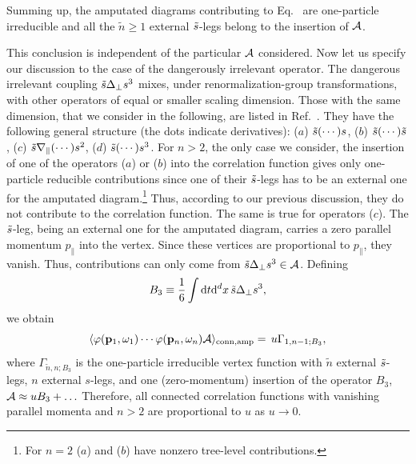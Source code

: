 \documentclass[12pt]{article}
\begin{document}
Summing up, the amputated diagrams contributing to
Eq.~ are one-particle irreducible and all the $\tilde{n}\ge
1$ external $\tilde{s}$-legs belong to the insertion of ${\cal A}$.

This conclusion is independent of the particular ${\cal A}$
considered. Now let us specify our discussion to the case of the
dangerously irrelevant operator. The dangerous irrelevant coupling 
$\tilde{s}\Delta_{\bot} s^3$ mixes, under renormalization-group transformations, 
with other operators of equal or
smaller scaling dimension. Those with the same dimension, that we
consider in the following, are listed in 
Ref.~\cite{Janssen86a}. 
They have the following general structure (the dots 
indicate derivatives): ($a$) $\tilde{s} (\cdots) s$, ($b$)
$\tilde{s} (\cdots) \tilde{s}$, ($c$) $\tilde{s} \nabla_{\|} (\cdots) s^2$,
($d$) $\tilde{s} (\cdots) s^3$.
For $n > 2$, the only case we consider,
the insertion of one of the operators ($a$) or ($b$) into
the correlation function gives only
one-particle reducible contributions since one of their $\tilde{s}$-legs
has to be an external one for the amputated diagram.\footnote{For $n=2$
($a$) and ($b$) have nonzero tree-level contributions.} Thus, according
to our previous discussion, they do not 
contribute to the correlation function. The same is true for operators 
($c$). The $\tilde{s}$-leg, 
being an external one for the amputated diagram,
carries a zero parallel momentum $p_\|$ into the vertex. Since
these vertices are proportional
to  $p_\|$, they vanish.
Thus, contributions can only come from $\tilde{s} \Delta_{\bot} s^3\in {\cal A}$. 
Defining
\begin{equation}
B_3 \equiv \frac{1}{6}\int {\rm d} t {\rm d}^dx \, \tilde{s} \Delta_{\bot} s^3 ,
\end{equation}
we obtain 
\begin{equation}
\langle \varphi({\bf p}_1,\omega_1) \cdots \varphi({\bf p}_n,\omega_n) {\cal A}
   \rangle_{\rm conn,amp}  =\, 
u \Gamma_{1,n-1;B_3} , 
\label{final-expr}
\end{equation}
where $\Gamma_{\tilde{n},n;B_3}$ is the one-particle irreducible
vertex function with $\tilde{n}$ external $\tilde{s}$-legs, $n$ external
$s$-legs, and one (zero-momentum) insertion of the operator $B_3$,
${\cal A} \approx u B_3 + \ldots$ Therefore, all connected correlation 
functions with vanishing parallel momenta and $n>2$ are proportional to $u$ 
as $u\to 0$. 
\end{document}
